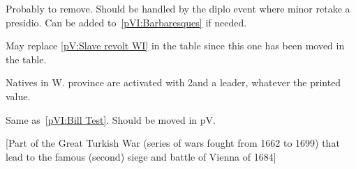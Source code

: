 
\begin{todo}
  Probably to remove. Should be handled by the diplo event where minor retake
  a presidio. Can be added to~\ref{pVI:Barbaresques} if needed.
\end{todo}

\begin{todo}
  May replace \ref{pV:Slave revolt WI} in the table since this one has
  been moved in the \REVOLT table.
\end{todo}

\phevnt
\aparag Natives in  W. province are activated with 2\LD and
a leader, whatever the printed value.


Same as~\ref{pVI:Bill Test}. Should be moved in pV.


[Part of the Great Turkish War (series of wars fought from
1662 to 1699) that lead to the famous (second) siege and battle of Vienna of
1684]

\stopevents


